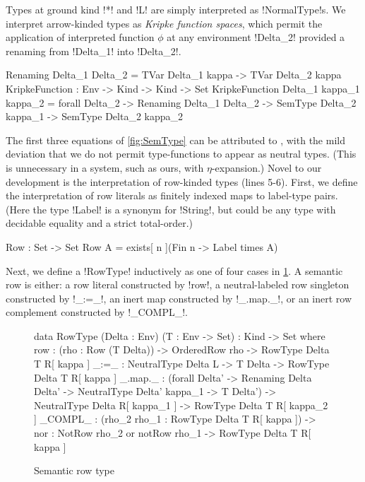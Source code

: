 \documentclass[sigplan,10pt,anonymous,review]{acmart}\settopmatter{printfolios=true,printccs=false,printacmref=false}
\begin{document}
Types at ground kind !*! and !L! are simply interpreted as !NormalType!s. We interpret arrow-kinded types as \emph{Kripke function spaces}, which permit the application of interpreted function $\phi$ at any environment !Delta_2! provided a renaming from !Delta_1! into !Delta_2!. %

\begin{agda}
Renaming Delta_1  Delta_2 = TVar Delta_1 kappa -> TVar Delta_2 kappa
KripkeFunction : Env -> Kind -> Kind -> Set
KripkeFunction Delta_1  kappa_1  kappa_2 =  forall {Delta_2} -> 
  Renaming Delta_1  Delta_2 -> SemType Delta_2  kappa_1 -> SemType Delta_2  kappa_2
\end{agda}

The first three equations of \cref{fig:SemType} can be attributed to \citet{ChapmanKNW19}, with the mild deviation that we do not permit type-functions to appear as neutral types. (This is unnecessary in a system, such as ours, with $\eta$-expansion.) Novel to our development is the interpretation of row-kinded types (lines 5-6). First, we define the interpretation of row literals as finitely indexed maps to label-type pairs. (Here the type !Label! is a synonym for !String!, but could be any type with decidable equality and a strict total-order.)

\begin{agda} 
Row : Set -> Set
Row A = exists[ n ](Fin n -> Label times A)
\end{agda}

\Ni Next, we define a !RowType! inductively as one of four cases in \cref{fig:semantic-rows}. A semantic row is either: a row literal constructed by !row!, a neutral-labeled row singleton constructed by !_:=_!, an inert map constructed by !_.map._!, or an inert row complement constructed by !_COMPL_!.
\begin{figure}
\begin{agda}
data RowType (Delta : Env) 
             (T : Env -> Set) : Kind -> Set where 
  row      : (rho : Row (T Delta)) -> 
              OrderedRow rho -> 
              RowType Delta T R[ kappa ]
  _:=_     : NeutralType Delta L -> 
             T Delta -> 
             RowType Delta T R[ kappa ]
  _.map._  : (forall {Delta'} -> 
                Renaming Delta Delta' -> 
                NeutralType Delta' kappa_1 -> 
                T Delta') -> 
             NeutralType Delta R[ kappa_1 ] -> 
             RowType Delta T R[ kappa_2 ]
  _COMPL_  : (rho_2  rho_1 : RowType Delta T R[ kappa ]) -> 
             {nor : NotRow rho_2  or  notRow rho_1} -> 
             RowType Delta T R[ kappa ]
\end{agda}
\caption{Semantic row type}
\label{fig:semantic-rows}
\end{figure}
\end{document}
